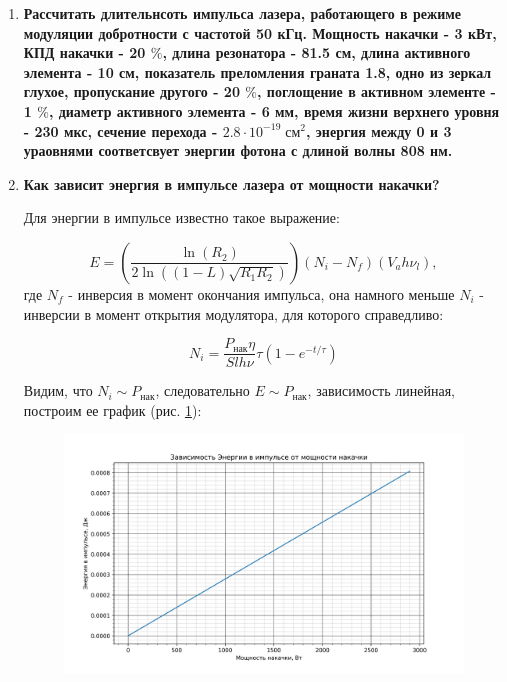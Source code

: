 \documentclass[a4paper]{article}
\begin{document}
\begin{enumerate}
	\item \textbf{Рассчитать длительнсоть импульса лазера, работающего в режиме модуляции добротности с частотой 50 кГц. Мощность накачки - 3 кВт, КПД накачки - 20 $\%$, длина резонатора - 81.5 см, длина активного элемента - 10 см, показатель преломления граната 1.8, одно из зеркал глухое, пропускание другого - 20 $\%$, поглощение в активном элементе - 1 $\%$, диаметр активного элемента - 6 мм, время жизни верхнего уровня - 230 мкс, сечение перехода - $2.8 \cdot 10^{-19}\;см^{2}$, энергия между 0 и 3 ураовнями соответсвует энергии фотона с длиной волны 808 нм.} \par 
	\item \textbf{Как зависит энергия в импульсе лазера от мощности накачки?} \par 

	Для энергии в импульсе известно такое выражение:

	\begin{equation}
		E = \left( \frac{\ln{(R_2)}}{2\ln{((1-L)\sqrt{R_1R_2})}} \right) (N_i - N_f) (V_ah\nu_l),
	\end{equation}
	где $N_f$ - инверсия в момент окончания импульса, она намного меньше $N_i$ - инверсии в момент открытия модулятора, для которого справедливо:

	\begin{equation}
		N_i = \frac{P_{нак} \eta}{Slh\nu} \tau \left ( 1 - e^{-t/\tau} \right)
	\end{equation}

	Видим, что $N_i \sim P_{нак}$, следовательно  $E \sim P_{нак}$, зависимость линейная, построим ее график (рис. \ref{E_p(P)}):

	\begin{figure}[H]
		\begin{center}
			\includegraphics[scale = 0.5]{E_p(P).png}
			\caption{}
			\label{E_p(P)}
		\end{center}
	\end{figure}


\end{enumerate}
\end{document}
